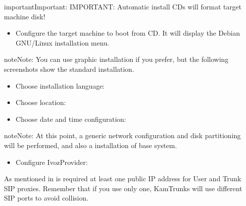 \documentclass[letterpaper,10pt,english]{sphinxmanual}
\begin{document}
\begin{notice}{important}{Important:}
IMPORTANT: Automatic install CDs will format target machine disk!
\end{notice}
\begin{itemize}
\item {} 
Configure the target machine to boot from CD. It will display the Debian
GNU/Linux installation menu.

\end{itemize}

\begin{notice}{note}{Note:}
You can use graphic installation if you prefer, but the following
screenshots show the standard installation.
\end{notice}

\noindent{}
\begin{itemize}
\item {} 
Choose installation language:

\end{itemize}

\noindent{}
\begin{itemize}
\item {} 
Choose location:

\end{itemize}

\noindent{}
\begin{itemize}
\item {} 
Choose date and time configuration:

\end{itemize}

\noindent{}

\begin{notice}{note}{Note:}
At this point, a generic network configuration and disk partitioning
will be performed, and also a installation of base system.
\end{notice}
\begin{itemize}
\item {} 
Configure IvozProvider:

\end{itemize}

\noindent{}

As mentioned in {\hyperref[installation/requirements:minimum\string-requirements]{}} is required at least one public IP
address for User and Trunk SIP proxies. Remember that if you use only one,
KamTrunks will use different SIP ports to avoid collision.
\end{document}
